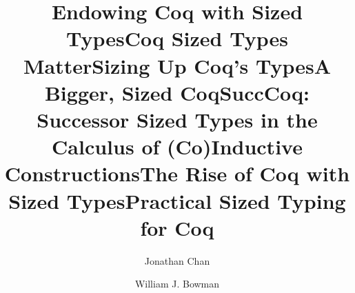\title{Endowing Coq with Sized Types}
\title{Coq Sized Types Matter}
\title{Sizing Up Coq's Types}
\title{A Bigger, Sized Coq}
\title{SuccCoq: Successor Sized Types in the Calculus of (Co)Inductive Constructions}
\title{The Rise of Coq with Sized Types}
\title{Practical Sized Typing for Coq}

\author{Jonathan Chan}

\author{William J. Bowman}

\usepackage{amsmath}
\usepackage{amsfonts}
\usepackage{mathtools}
\usepackage{stmaryrd}
\usepackage{minted}
\usepackage{bussproofs}
\usepackage{cuted}
\usepackage{hyphenat}
\usepackage{stackengine}
\usepackage{xspace}
\usepackage[shortcuts]{extdash}
\usepackage{soul}
\usepackage{enumitem}
\usepackage[title]{appendix}
\usepackage{placeins}

\def\sectionautorefname{Section}
\def\subsectionautorefname{Subsection}
\def\subsubsectionautorefname{Subsubsection}
\def\figureautorefname{Figure}
\def\tableautorefname{Table}
\def\Appendixautorefname{Appendix}
\hypersetup{colorlinks = true}

